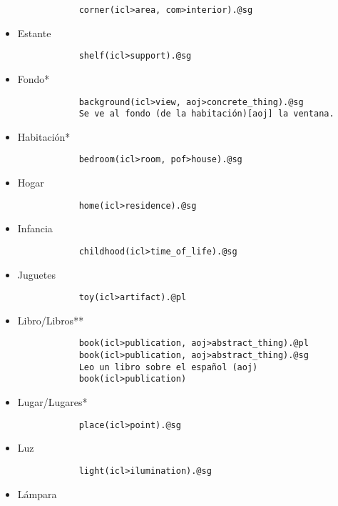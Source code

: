 \documentclass{article}
\begin{document}
\begin{itemize}
        \begin{verbatim}
            corner(icl>area, com>interior).@sg
        \end{verbatim}
        \item Estante
        \begin{verbatim}
            shelf(icl>support).@sg
        \end{verbatim}
        \item Fondo*
        \begin{verbatim}
            background(icl>view, aoj>concrete_thing).@sg
            Se ve al fondo (de la habitación)[aoj] la ventana.
        \end{verbatim}
        \item Habitación*
        \begin{verbatim}
            bedroom(icl>room, pof>house).@sg
        \end{verbatim}
        \item Hogar
        \begin{verbatim}
            home(icl>residence).@sg
        \end{verbatim}
        \item Infancia
        \begin{verbatim}
            childhood(icl>time_of_life).@sg
        \end{verbatim}
        \item Juguetes
        \begin{verbatim}
            toy(icl>artifact).@pl
        \end{verbatim}
        \item Libro/Libros**
        \begin{verbatim}
            book(icl>publication, aoj>abstract_thing).@pl
            book(icl>publication, aoj>abstract_thing).@sg
            Leo un libro sobre el español (aoj)
            book(icl>publication)
        \end{verbatim}
        \item Lugar/Lugares*
        \begin{verbatim}
            place(icl>point).@sg
        \end{verbatim}
        \item Luz
        \begin{verbatim}
            light(icl>ilumination).@sg
        \end{verbatim}
        \item Lámpara
        \begin{verbatim}

\end{verbatim}
\end{itemize}
\end{document}
